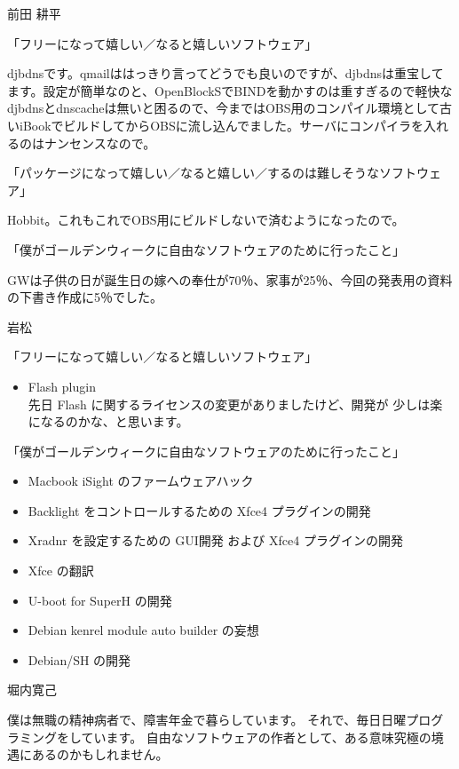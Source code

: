 \documentclass[cjk,dvipdfmx,12pt]{beamer}
\begin{document}
\begin{frame}{前田 耕平}

「フリーになって嬉しい／なると嬉しいソフトウェア」

djbdnsです。qmailははっきり言ってどうでも良いのですが、djbdnsは重宝してます。設定が簡単なのと、OpenBlockSでBINDを動かすのは重すぎるので軽快なdjbdnsとdnscacheは無いと困るので、今まではOBS用のコンパイル環境として古いiBookでビルドしてからOBSに流し込んでました。サーバにコンパイラを入れるのはナンセンスなので。

「パッケージになって嬉しい／なると嬉しい／するのは難しそうなソフトウェア」

Hobbit。これもこれでOBS用にビルドしないで済むようになったので。

「僕がゴールデンウィークに自由なソフトウェアのために行ったこと」

GWは子供の日が誕生日の嫁への奉仕が70％、家事が25％、今回の発表用の資料の下書き作成に5％でした。
\end{frame}\begin{frame}{岩松}

「フリーになって嬉しい／なると嬉しいソフトウェア」
\begin{itemize}
 \item   Flash plugin\\
 先日 Flash に関するライセンスの変更がありましたけど、開発が
 少しは楽になるのかな、と思います。
\end{itemize}

「僕がゴールデンウィークに自由なソフトウェアのために行ったこと」

\begin{itemize}
 \item   Macbook iSight のファームウェアハック
 \item  Backlight をコントロールするための Xfce4 プラグインの開発
 \item  Xradnr を設定するための GUI開発 および Xfce4 プラグインの開発
 \item  Xfce の翻訳
 \item  U-boot for SuperH の開発
 \item  Debian kenrel module auto builder の妄想
 \item  Debian/SH の開発
\end{itemize}


\end{frame}\begin{frame}{堀内寛己}

僕は無職の精神病者で、障害年金で暮らしています。
それで、毎日日曜プログラミングをしています。
自由なソフトウェアの作者として、ある意味究極の境遇にあるのかもしれません。


\end{frame}
\end{document}
